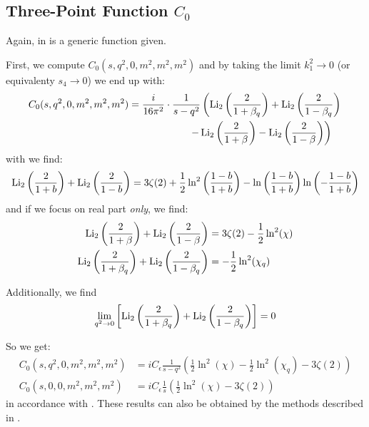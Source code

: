 \subsection[Three-Point Function C0]{Three-Point Function $C_0$}
Again, in \cite[eq. (4.26)]{Denner:2005nn} is a generic function given.

First, we compute $C_0(s,q^2,0,m^2,m^2,m^2)$ and by taking the limit $k_1^2\rightarrow 0$ (or equivalenty $s_4\rightarrow 0$) we end up with:
\begin{align}
C_0(s,q^2,0,m^2,m^2,m^2)&=\frac{i}{16\pi^2}\cdot\frac 1{s-q^2}\left(\operatorname{\text{Li}_2}\left(\frac 2 {1+\beta_q}\right)+\operatorname{\text{Li}_2}\left(\frac 2 {1-\beta_q}\right)\right.\nonumber\\
&\hspace{60pt}\left.-\operatorname{\text{Li}_2}\left(\frac 2 {1+\beta}\right)-\operatorname{\text{Li}_2}\left(\frac 2 {1-\beta}\right)\right)
\end{align}
with \cite{Zagier2007} we find:
\begin{equation}
\operatorname{\text{Li}_2}\left(\frac 2 {1+b}\right)+\operatorname{\text{Li}_2}\left(\frac 2 {1-b}\right) =3\zeta(2)+\frac 1 2\ln^2\left(\frac{1-b}{1+b}\right)-\ln\left(\frac{1-b}{1+b}\right)\ln\left(-\frac{1-b}{1+b}\right)
\end{equation}
and if we focus on real part \textit{only}, we find:
\begin{align}
\operatorname{\text{Li}_2}\left(\frac 2 {1+\beta}\right)+\operatorname{\text{Li}_2}\left(\frac 2 {1-\beta}\right) &=3\zeta(2)-\frac 1 2\ln^2(\chi)\\
\operatorname{\text{Li}_2}\left(\frac 2 {1+\beta_q}\right)+\operatorname{\text{Li}_2}\left(\frac 2 {1-\beta_q}\right) &=-\frac 1 2\ln^2(\chi_q)
\end{align}

Additionally, we find
\begin{equation}
\lim_{q^2\rightarrow 0}\left[\operatorname{\text{Li}_2}\left(\frac 2 {1+\beta_q}\right)+\operatorname{\text{Li}_2}\left(\frac 2 {1-\beta_q}\right)\right] = 0
\end{equation}

So we get:
\begin{align}
C_0(s,q^2,0,m^2,m^2,m^2)&=iC_\epsilon\frac 1{s-q^2}\left(\frac 1 2\ln^2(\chi)-\frac 1 2\ln^2(\chi_q)-3\zeta(2)\right)\\
C_0(s,0,0,m^2,m^2,m^2)&=iC_\epsilon\frac 1{s}\left(\frac 1 2\ln^2(\chi)-3\zeta(2)\right)
\end{align}
in accordance with \cite{Bojak:2000eu}\cite{PhysRevD.40.54}\cite{Laenen1993162}. These results can also be obtained by the methods described in \cite[chap. 3]{Bojak:2000eu}.

